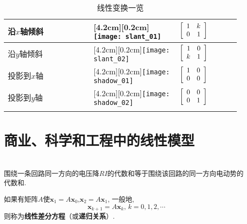 \begin{longtable}{>{\raggedright}m{0.35\linewidth}>{\centering}m{0.35\linewidth}>{\centering\arraybackslash}m{0.25\linewidth}}
沿$x$轴倾斜 & \raisebox{0pt}[4.2cm][0.2cm]{\texttt{[image: slant\_01]}} & $\left[\begin{array}{r r} 1 & k\\ 0 & 1\end{array}\right]$\\\hline
沿$y$轴倾斜 & \raisebox{0pt}[4.2cm][0.2cm]{\texttt{[image: slant\_02]}} & $\left[\begin{array}{r r} 1 & 0\\ k & 1\end{array}\right]$\\\hline
投影到$x$轴 & \raisebox{0pt}[4.2cm][0.2cm]{\texttt{[image: shadow\_01]}} & $\left[\begin{array}{r r} 1 & 0\\ 0 & 0\end{array}\right]$\\\hline
投影到$y$轴 & \raisebox{0pt}[4.2cm][0.2cm]{\texttt{[image: shadow\_02]}} & $\left[\begin{array}{r r} 0 & 0\\ 0 & 1\end{array}\right]$\\\hline
\caption{线性变换一览}
\end{longtable}\vspace{6ex}

\section{商业、科学和工程中的线性模型}
\begin{law}[基尔霍夫电压定律]\ \\
围绕一条回路同一方向的电压降$RI$的代数和等于围绕该回路的同一方向电动势的代数和.
\end{law}\vspace{4ex}

\begin{law}
如果有矩阵$A$使$\bm{x}_1=A\bm{x}_0$,$\bm{x}_2=A\bm{x}_1$, 一般地,
\[\bm{x}_{k+1}=A\bm{x}_k\text{,\ }k=0,1,2,\cdots\]
则称为\textbf{线性差分方程}（或\textbf{递归关系}）.
\end{law}
